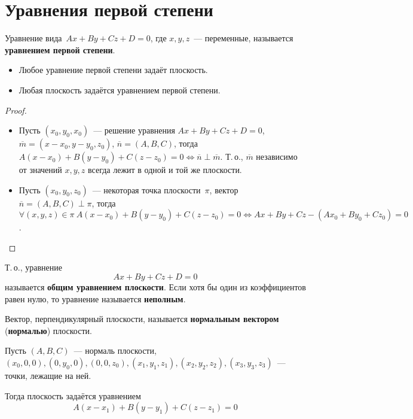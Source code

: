 \section{Уравнения первой степени}
Уравнение вида~$Ax + By + Cz + D = 0$, где $x, y, z$~--- переменные, называется \textbf{уравнением первой степени}.

\begin{theorem}
\begin{itemize}
	\item Любое уравнение первой степени задаёт плоскость.
	\item Любая плоскость задаётся уравнением первой степени.
\end{itemize}
\end{theorem}
\begin{proof}
\begin{itemize}
	\item Пусть $(x_0, y_0, x_0)$~--- решение уравнения $Ax + By + Cz + D = 0$, $\overline m = (x - x_0, y - y_0, z_0)$, $\overline n = (A, B, C)$, тогда $A(x - x_0) + B(y - y_0) + C(z - z_0) = 0 \Leftrightarrow \overline n \perp \overline m$.
	Т.\,о., $\overline m$ независимо от значений $x, y, z$ всегда лежит в одной и той же плоскости.
	
	\item Пусть $(x_0, y_0, z_0)$~--- некоторая точка плоскости~$\pi$, вектор~$\overline n = (A, B, C) \perp \pi$, тогда $\forall (x, y, z) \in \pi \ A(x - x_0) + B(y - y_0) + C(z - z_0) = 0 \Leftrightarrow Ax + By + Cz - (Ax_0 + By_0 + Cz_0) = 0$.
\end{itemize}
\end{proof}

 Т.\,о., уравнение
\begin{equation*}
Ax + By + Cz + D = 0
\end{equation*}
называется \textbf{общим уравнением плоскости}.
Если хотя бы один из коэффициентов равен нулю, то уравнение называется \textbf{неполным}.

 Вектор, перпендикулярный плоскости, называется \textbf{нормальным вектором} (\textbf{нормалью}) плоскости.

Пусть $(A, B, C)$~--- нормаль плоскости, $(x_0, 0, 0), (0, y_0, 0), (0, 0, z_0), (x_1, y_1, z_1), (x_2, y_2, z_2), (x_3, y_3, z_3)$~--- точки, лежащие на ней.

Тогда плоскость задаётся уравнением
\begin{equation*}
A(x - x_1) + B(y - y_1) + C(z - z_1) = 0
\end{equation*}

